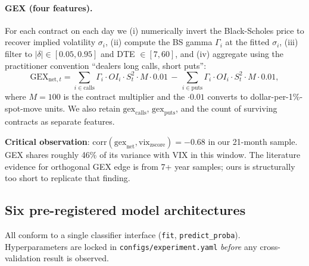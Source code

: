 \documentclass[11pt,a4paper]{article}
\begin{document}
\paragraph{GEX (four features).} For each contract on each day we (i) numerically invert the Black-Scholes price to recover implied volatility $\sigma_i$, (ii) compute the BS gamma $\Gamma_i$ at the fitted $\sigma_i$, (iii) filter to $|\delta| \in [0.05, 0.95]$ and DTE $\in [7, 60]$, and (iv) aggregate using the practitioner convention ``dealers long calls, short puts'':
\begin{equation}
    \text{GEX}_{\text{net}, t} = \sum_{i \in \text{calls}} \Gamma_i \cdot OI_i \cdot S_t^2 \cdot M \cdot 0.01 \,-\, \sum_{i \in \text{puts}} \Gamma_i \cdot OI_i \cdot S_t^2 \cdot M \cdot 0.01,
\end{equation}
where $M = 100$ is the contract multiplier and the $\cdot 0.01$ converts to dollar-per-1\%-spot-move units. We also retain $\text{gex}_{\text{calls}}$, $\text{gex}_{\text{puts}}$, and the count of surviving contracts as separate features.

\textbf{Critical observation}: $\text{corr}(\text{gex}_{\text{net}}, \text{vix}_{\text{zscore}}) = -0.68$ in our 21-month sample. GEX shares roughly 46\% of its variance with VIX in this window. The literature evidence for orthogonal GEX edge is from 7+ year samples; ours is structurally too short to replicate that finding.

\subsection{Six pre-registered model architectures}

All conform to a single classifier interface (\verb|fit|, \verb|predict_proba|). Hyperparameters are locked in \verb|configs/experiment.yaml| \emph{before} any cross-validation result is observed.
\end{document}
